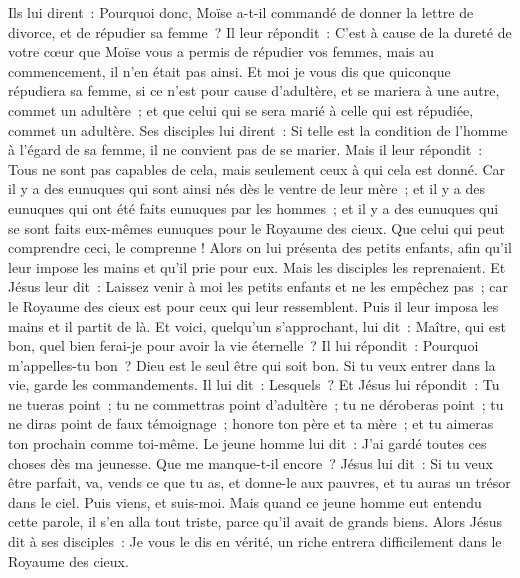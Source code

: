 \begin{multicols}{2}
Ils lui dirent~: Pourquoi donc, Moïse a-t-il commandé de donner la lettre de divorce, et de répudier sa femme~?
Il leur répondit~: C'est à cause de la dureté de votre cœur que Moïse vous a permis de répudier vos femmes, mais au commencement, il n'en était pas ainsi.
Et moi je vous dis que quiconque répudiera sa femme, si ce n'est pour cause d'adultère, et se mariera à une autre, commet un adultère~; et que celui qui se sera marié à celle qui est répudiée, commet un adultère.
Ses disciples lui dirent~: Si telle est la condition de l'homme à l'égard de sa femme, il ne convient pas de se marier.
Mais il leur répondit~: Tous ne sont pas capables de cela, mais seulement ceux à qui cela est donné.
Car il y a des eunuques qui sont ainsi nés dès le ventre de leur mère~; et il y a des eunuques qui ont été faits eunuques par les hommes~; et il y a des eunuques qui se sont faits eux-mêmes eunuques pour le Royaume des cieux. Que celui qui peut comprendre ceci, le comprenne !
Alors on lui présenta des petits enfants, afin qu'il leur impose les mains et qu'il prie pour eux. Mais les disciples les reprenaient.
Et Jésus leur dit~: Laissez venir à moi les petits enfants et ne les empêchez pas~; car le Royaume des cieux est pour ceux qui leur ressemblent.
Puis il leur imposa les mains et il partit de là.
Et voici, quelqu'un s'approchant, lui dit~: Maître, qui est bon, quel bien ferai-je pour avoir la vie éternelle~?
Il lui répondit~: Pourquoi m'appelles-tu bon~? Dieu est le seul être qui soit bon. Si tu veux entrer dans la vie, garde les commandements.
Il lui dit~: Lesquels~? Et Jésus lui répondit~: Tu ne tueras point~; tu ne commettras point d'adultère~; tu ne déroberas point~; tu ne diras point de faux témoignage~;
honore ton père et ta mère~; et tu aimeras ton prochain comme toi-même.
Le jeune homme lui dit~: J'ai gardé toutes ces choses dès ma jeunesse. Que me manque-t-il encore~?
Jésus lui dit~: Si tu veux être parfait, va, vends ce que tu as, et donne-le aux pauvres, et tu auras un trésor dans le ciel. Puis viens, et suis-moi.
Mais quand ce jeune homme eut entendu cette parole, il s'en alla tout triste, parce qu'il avait de grands biens.
Alors Jésus dit à ses disciples~: Je vous le dis en vérité, un riche entrera difficilement dans le Royaume des cieux.

\end{multicols}

